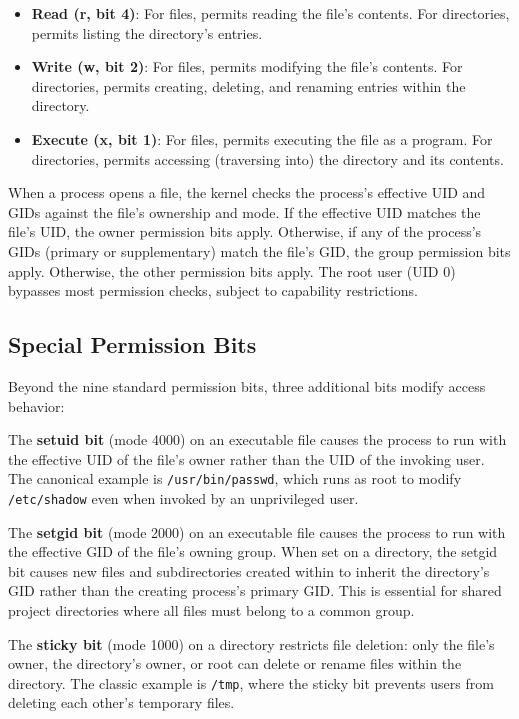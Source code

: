 \begin{itemize}
  \item \textbf{Read (r, bit 4)}: For files, permits reading the file's contents. For directories, permits listing the directory's entries.
  \item \textbf{Write (w, bit 2)}: For files, permits modifying the file's contents. For directories, permits creating, deleting, and renaming entries within the directory.
  \item \textbf{Execute (x, bit 1)}: For files, permits executing the file as a program. For directories, permits accessing (traversing into) the directory and its contents.
\end{itemize}

When a process opens a file, the kernel checks the process's effective UID and GIDs against the file's ownership and mode. If the effective UID matches the file's UID, the owner permission bits apply. Otherwise, if any of the process's GIDs (primary or supplementary) match the file's GID, the group permission bits apply. Otherwise, the other permission bits apply. The root user (UID 0) bypasses most permission checks, subject to capability restrictions.

\subsection{Special Permission Bits}

Beyond the nine standard permission bits, three additional bits modify access behavior:

The \textbf{setuid bit} (mode 4000) on an executable file causes the process to run with the effective UID of the file's owner rather than the UID of the invoking user. The canonical example is \texttt{/usr/bin/passwd}, which runs as root to modify \texttt{/etc/shadow} even when invoked by an unprivileged user.

The \textbf{setgid bit} (mode 2000) on an executable file causes the process to run with the effective GID of the file's owning group. When set on a directory, the setgid bit causes new files and subdirectories created within to inherit the directory's GID rather than the creating process's primary GID. This is essential for shared project directories where all files must belong to a common group.

The \textbf{sticky bit} (mode 1000) on a directory restricts file deletion: only the file's owner, the directory's owner, or root can delete or rename files within the directory. The classic example is \texttt{/tmp}, where the sticky bit prevents users from deleting each other's temporary files.

